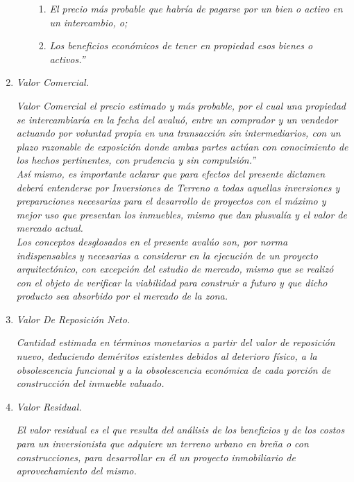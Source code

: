 \begin{enumerate}
\begin{enumerate}
\begin{enumerate}
\item\textit{ El precio m\'as probable que habr\'ia de pagarse por un bien o activo en un intercambio, o;} 
\item \textit{Los beneficios econ\'omicos de tener en propiedad esos bienes o activos.''}

\end{enumerate}
\end{enumerate}

\item  \textcolor{principal}{\textit{Valor Comercial. }}

\textit{Valor Comercial el precio estimado y m\'as probable, por el cual una propiedad se intercambiar\'ia en la fecha del avalu\'o, entre un comprador y un vendedor actuando por voluntad propia en una transacci\'on sin intermediarios, con un plazo razonable de exposici\'on donde ambas partes act\'uan con conocimiento de los hechos pertinentes, con prudencia y sin compulsi\'on.''}\\

\textit{As\'i mismo, es importante aclarar que para efectos del presente dictamen deber\'a entenderse por Inversiones de Terreno a todas aquellas inversiones y preparaciones necesarias para el desarrollo de proyectos con el m\'aximo y mejor uso que presentan los inmuebles, mismo que dan plusval\'ia y el valor de mercado actual. }\\

\textit{Los conceptos desglosados en el presente aval\'uo son, por norma indispensables y necesarias a considerar en la ejecuci\'on de un proyecto arquitect\'onico, con excepci\'on del estudio de mercado, mismo que se realiz\'o con el objeto de verificar la viabilidad para construir a futuro y que dicho producto sea absorbido por el mercado de la zona. }\\

\item \textcolor{principal}{\textit{Valor De Reposici\'on Neto.}}

\textit{Cantidad estimada en t\'erminos monetarios a partir del valor de reposici\'on nuevo, deduciendo dem\'eritos existentes debidos al deterioro f\'isico, a la obsolescencia funcional y a la obsolescencia econ\'omica de cada porci\'on de construcci\'on del inmueble valuado.}

\item \textcolor{principal}{ \textit{Valor Residual.}}

\textit{El valor residual es el que resulta del an\'alisis de los beneficios y de los costos para un inversionista que adquiere un terreno urbano en bre\~na o con construcciones, para desarrollar en \'el un proyecto inmobiliario de aprovechamiento del mismo.}

\end{enumerate}
